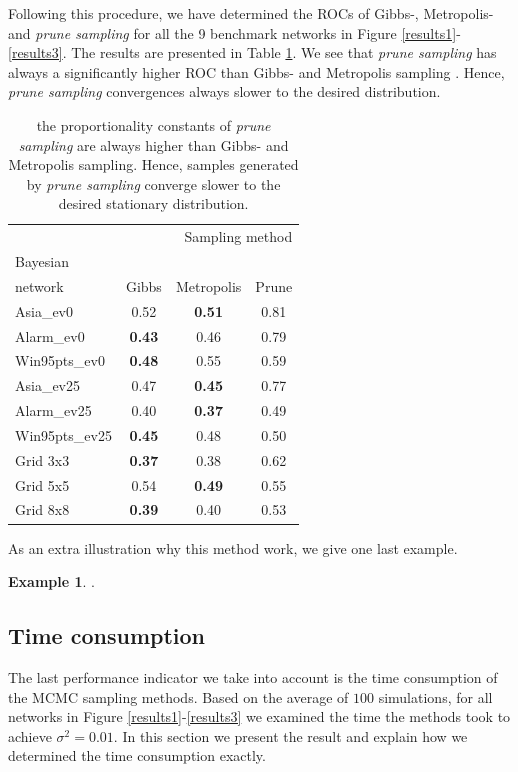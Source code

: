 \documentclass[a4paper, twoside, 11pt]{report}
\theoremstyle{plain}
\theoremstyle{definition}
\newtheorem{example}[thm]{Example}
\theoremstyle{remark}
\newcommand{\ps}{\textit{prune sampling }}
\begin{document}
Following this procedure, we have determined the ROCs of Gibbs-, Metropolis- and \ps for all the 9 benchmark networks in Figure \ref{results1}-\ref{results3}. The results are presented in Table \ref{ROC-table}. We see that \ps has always a significantly higher ROC than Gibbs- and Metropolis sampling . Hence, \ps convergences always slower to the desired distribution.
\begin{center}
\begin{table}[H]
\begin{center}
\begin{tabular}{l c c c}  
\toprule
\multicolumn{4}{r}{Sampling method} \\
\cmidrule(r){2-4}
Bayesian \\ network    & Gibbs    & Metropolis & Prune  \\
\midrule
Asia\_ev0 & 0.52 & \textbf{0.51} & 0.81  \\
Alarm\_ev0 & \textbf{0.43} & 0.46 & 0.79  \\
Win95pts\_ev0 & \textbf{0.48} & 0.55 & 0.59  \\
Asia\_ev25 & 0.47 & \textbf{0.45} & 0.77  \\
Alarm\_ev25 & 0.40 & \textbf{0.37} & 0.49  \\
Win95pts\_ev25 & \textbf{0.45} & 0.48 & 0.50  \\
Grid 3x3 & \textbf{0.37} & 0.38 & 0.62  \\
Grid 5x5 & 0.54 & \textbf{0.49} & 0.55  \\
Grid 8x8 & \textbf{0.39} & 0.40 & 0.53  \\
\bottomrule
\end{tabular}
\caption{the proportionality constants of \ps are always higher than Gibbs- and Metropolis sampling. Hence, samples generated by \ps converge slower to the desired stationary distribution.}
\label{ROC-table}
\end{center}
\end{table}
\end{center}
As an extra illustration why this method work, we give one last example.
\begin{example}
.
\end{example}

\subsection{Time consumption}
The last performance indicator we take into account is the time consumption of the MCMC sampling methods. Based on the average of $100$ simulations, for all networks in Figure \ref{results1}-\ref{results3} we examined the time the methods took to achieve $\sigma^2 = 0.01$. In this section we present the result and explain how we determined the time consumption exactly. \\
\end{document}
